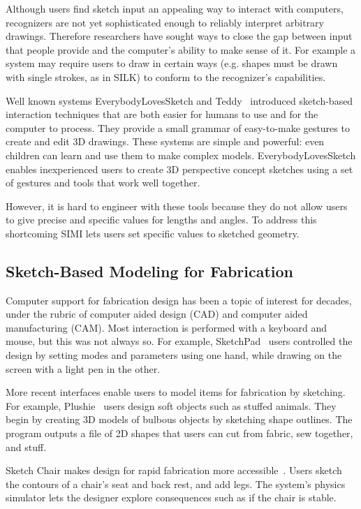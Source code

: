 \documentclass{article}
\begin{document}
Although users find sketch input an appealing way to interact with
computers, recognizers are not yet sophisticated enough to reliably
interpret arbitrary drawings. Therefore researchers have sought ways
to close the gap between input that people provide and the computer's
ability to make sense of it. For example a system may require users to
draw in certain ways (e.g. shapes must be drawn with single strokes,
as in SILK) to conform to the recognizer's capabilities.

Well known systems EverybodyLovesSketch and Teddy~\cite{bae-everybody,
  igarashi-teddy} introduced sketch-based interaction techniques that
are both easier for humans to use and for the computer to
process. They provide a small grammar of easy-to-make gestures to
create and edit 3D drawings. These systems are simple and powerful:
even children can learn and use them to make complex
models. EverybodyLovesSketch enables inexperienced users to create 3D
perspective concept sketches using a set of gestures and tools that
work well together.

However, it is hard to engineer with these tools because they do not
allow users to give precise and specific values for lengths and
angles. To address this shortcoming SIMI lets users set specific
values to sketched geometry.

\subsection{Sketch-Based Modeling for Fabrication}

Computer support for fabrication design has been a topic of interest
for decades, under the rubric of computer aided design (CAD) and
computer aided manufacturing (CAM). Most interaction is performed with
a keyboard and mouse, but this was not always so. For example,
SketchPad~\cite{sutherland-sketchpad} users controlled the design by
setting modes and parameters using one hand, while drawing on the
screen with a light pen in the other.

More recent interfaces enable users to model items for fabrication by
sketching. For example, Plushie~\cite{mori-plushie} users design soft
objects such as stuffed animals. They begin by creating 3D models of
bulbous objects by sketching shape outlines. The program outputs a
file of 2D shapes that users can cut from fabric, sew together, and
stuff.

Sketch Chair makes design for rapid fabrication more
accessible~\cite{saul-sketch-chair}. Users sketch the contours of a
chair's seat and back rest, and add legs. The system's physics
simulator lets the designer explore consequences such as if the chair
is stable.
\end{document}
